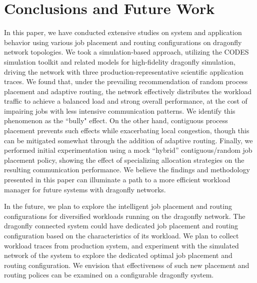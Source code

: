 \section{Conclusions and Future Work}
\label{sec:conclusion}

In this paper, we have conducted extensive studies on system and application behavior using various job placement and routing configurations on dragonfly network topologies. We took a simulation-based approach, utilizing the CODES simulation toolkit and related models for high-fidelity dragonfly simulation, driving the network with three production-representative scientific application traces. We found that, under the prevailing recommendation of random process placement and adaptive routing, the network effectively distributes the workload traffic to achieve a balanced load and strong overall performance, at the cost of impairing jobs with less intensive communication patterns. We identify this phenomenon as the ``bully" effect. On the other hand, contiguous process placement prevents such effects while exacerbating local congestion, though this can be mitigated somewhat through the addition of adaptive routing. Finally, we performed initial experimentation using a mock ``hybrid'' contiguous/random job placement policy, showing the effect of specializing allocation strategies on the resulting communication performance.
We believe the findings and methodology presented in this paper can illuminate a path to a more efficient workload manager for future systems with dragonfly networks. 

In the future, we plan to explore the intelligent job placement and routing configurations for diversified workloads running on the dragonfly network. The dragonfly connected system could have dedicated job placement and routing configuration based on the characteristics of its workload. We plan to collect workload traces from production system, and experiment with the simulated network of the system to explore the dedicated optimal job placement and routing configuration. We envision that effectiveness of such new placement and routing polices can be examined on a configurable dragonfly system. 